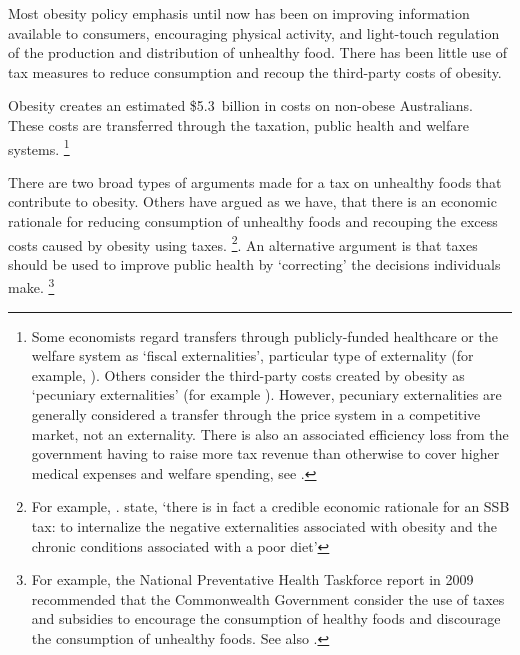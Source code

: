 \documentclass[embargoed]{grattan}
\begin{document}
Most obesity policy emphasis until now has been on improving information available to consumers, encouraging physical activity, and light-touch regulation of the production and distribution of unhealthy food.
There has been little use of tax measures to reduce consumption and recoup the third-party costs of obesity.

Obesity creates an estimated \$5.3~billion in costs on non-obese Australians.
These costs are transferred through the taxation, public health and welfare systems.%
\footnote{Some economists regard transfers through publicly-funded healthcare or the welfare system as `fiscal externalities', particular type of externality (for example, \textcite{Browning1999mythfiscalexternalities}).
Others consider the third-party costs created by obesity as `pecuniary externalities' (for example \textcite{Commission2010ChildhoodObesityEconomic}).
However, pecuniary externalities are generally considered a transfer through the price system in a competitive market, not an externality.
There is also an associated efficiency loss from the government having to raise more tax revenue than otherwise to cover higher medical expenses and welfare spending, see \textcite{Daley2015Propertytaxes}.}

There are two broad types of arguments made for a tax on unhealthy foods that contribute to obesity.
Others have argued as we have, that there is an economic rationale for reducing consumption of unhealthy foods and recouping the excess costs caused by obesity using taxes.%
\footnote{For example, \textcites{Veerman2016ImpactTaxSugar}{Karnani2016ObesityCrisisas}{Cawley2012medicalcarecosts}{Parks2012MarginalExternalCost}. \textcite{Cawley2015IncidenceTaxesSugar} state, `there is in fact a credible economic rationale for an SSB tax: to internalize the negative externalities associated with obesity and the chronic conditions associated with a poor diet'}.
An alternative argument is that taxes should be used to improve public health by `correcting' the decisions individuals make.%
\footnote{For example, the National Preventative Health Taskforce report in 2009 recommended that the Commonwealth Government consider the use of taxes and subsidies to encourage the consumption of healthy foods and discourage the consumption of unhealthy foods.
See also \textcites{Powell2013Assessingpotentialeffectiveness}{Organisation2015Usingpricepolicies}{Thow2014systematicrevieweffectiveness}{Sassi2013rolefiscalpolicies}.}
\end{document}
